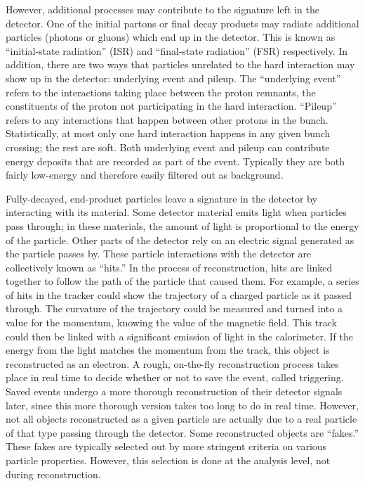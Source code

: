 However, additional processes may contribute 
to the signature left in the detector.  
One of the initial partons 
or final decay products 
may radiate additional particles (photons or gluons)
which 
end up in the detector.  
This is known as ``initial-state radiation'' (ISR) 
and ``final-state radiation'' (FSR) respectively.  
In addition, there are two ways that 
particles unrelated to the hard interaction 
may show up in the detector: 
underlying event and pileup.  
The ``underlying event'' refers to the 
interactions taking place between the 
proton remnants, 
the constituents of the proton %
not participating in %
the hard interaction.  
``Pileup'' refers to any interactions that happen 
between other protons in the bunch.  
Statistically, at most only one hard interaction 
happens in any given bunch crossing; the rest are soft.  
Both underlying event and pileup can contribute 
energy deposits that are recorded as part of the event.  
Typically they are both fairly low-energy and 
therefore easily filtered out as background.  


Fully-decayed, end-product 
particles leave a signature in the detector 
by interacting with its material.  
Some detector material emits light when 
particles pass through; 
in these materials, the amount of light 
is proportional to the energy of the particle.  
Other parts of the detector rely on an 
electric signal generated 
as the particle passes by.  
These particle interactions with the detector 
are collectively known as ``hits.''  
In the process of reconstruction, 
hits are linked together to 
follow the path of the particle that caused them.  
For example, a series of hits in the tracker 
could show the trajectory of a charged particle 
as it passed through.  
The curvature of the trajectory could be measured 
and turned into a value for the momentum, 
knowing the value of the magnetic field.  
This track could then be linked 
with a significant emission of light 
in the calorimeter.  
If the energy from the light 
matches the momentum from the track, 
this object is reconstructed as an electron.  
A rough, on-the-fly reconstruction 
process takes place in real time to decide 
whether or not to save the event, 
called triggering.  
Saved events undergo a more thorough 
reconstruction of their detector signals later, 
since this more thorough version 
takes too long to do in real time.  
However, not all objects reconstructed as 
a given particle are actually due to 
a real particle of that type 
passing through the detector.  
Some reconstructed objects are ``fakes.''  
These fakes are typically selected out 
by more stringent criteria on various 
particle properties. %
However, this selection is done at the analysis level, 
not during reconstruction.  

